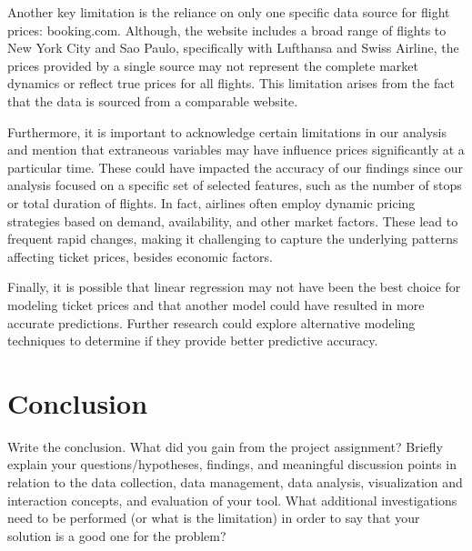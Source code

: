Another key limitation is the reliance on only one specific data source for flight prices: booking.com.
Although, the website includes a broad range of flights to New York City and Sao Paulo, specifically with Lufthansa and Swiss Airline, the prices provided by a single source may not represent the complete market dynamics or reflect true prices for all flights.
This limitation arises from the fact that the data is sourced from a comparable website.

Furthermore, it is important to acknowledge certain limitations in our analysis and mention that extraneous variables may have influence prices significantly at a particular time.
These could have impacted the accuracy of our findings since our analysis focused on a specific set of selected features, such as the number of stops or total duration of flights.
In fact, airlines often employ dynamic pricing strategies based on demand, availability, and other market factors.
These lead to frequent rapid changes, making it challenging to capture the underlying patterns affecting ticket prices, besides economic factors.

Finally, it is possible that linear regression may not have been the best choice for modeling ticket prices and that another model could have resulted in more accurate predictions.
Further research could explore alternative modeling techniques to determine if they provide better predictive accuracy.

\section{Conclusion}
\label{chap:conclusion}
Write the conclusion. What did you gain from the project assignment? Briefly explain your questions/hypotheses, findings, and meaningful discussion points in relation to the data collection, data management, data analysis, visualization and interaction concepts, and evaluation of your tool.
What additional investigations need to be performed (or what is the limitation) in order to say that your solution is a good one for the problem? 

